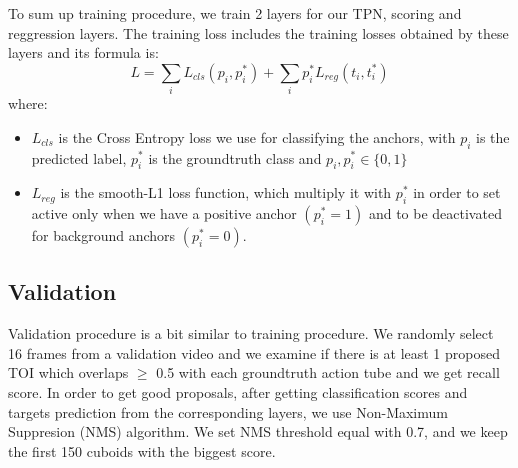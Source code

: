 \documentclass{report}
\begin{document}
To sum up training procedure, we train 2 layers for our TPN, scoring and reggression layers. The training loss includes the training losses
obtained by these layers and its formula is:
\[ L  =  \sum_iL_{cls}(p_i, p_i^*) + \sum_ip_i^*L_{reg}(t_i,t_i^*) \]
where:
\begin{itemize}
\item $L_{cls} $ is the Cross Entropy loss we use for classifying the anchors, with $p_i$ is the predicted label, $p_i^*$ is the groundtruth class and
  $p_i, p_i^* \in \{0,1\}$
\item $L_{reg} $ is the smooth-L1 loss function, which multiply it with $p_i^*$ in order to set active only when we have a positive anchor $(p_i^* = 1)$
  and to be deactivated for background anchors $(p_i^* = 0)$.
\end{itemize}

\subsection{Validation}

Validation procedure is a bit similar to training procedure.
We randomly select 16 frames from a validation video and we examine if there is at least 1 proposed TOI
which overlaps $\ge$ 0.5 with each groundtruth action tube and we get recall score. 
In order to get good proposals, after getting classification scores and targets prediction from the
corresponding layers, we use Non-Maximum Suppresion (NMS) algorithm.  We set NMS threshold equal with 0.7,
and we keep the first 150 cuboids with the biggest score.
\end{document}
